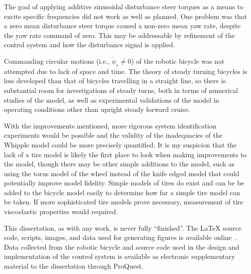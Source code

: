 The goal of applying additive sinusoidal disturbance steer torques as a means
to excite specific frequencies did not work as well as planned. One problem was
that a zero mean disturbance steer torque caused a non-zero mean yaw rate,
despite the yaw rate command of zero. This may be addressable by refinement of
the control system and how the disturbance signal is applied.

Commanding circular motions (i.e., $\dot{\psi}_c \ne 0$) of the robotic bicycle
was not attempted due to lack of space and time. The theory of steady turning
bicycles is less developed than that of bicycles travelling in a straight line,
so there is substantial room for investigations of steady turns, both in terms
of numerical studies of the model, as well as experimental validations of the
model in operating conditions other than upright steady forward cruise.

With the improvements mentioned, more rigorous system identification
experiments would be possible and the validity of the inadequacies of the
Whipple model could be more precisely quantified. It is my suspicion that the
lack of a tire model is likely the first place to look when making improvements
to the model, though there may be other simple additions to the model, such as
using the torus model of the wheel instead of the knife edged model that could
potentially improve model fidelity. Simple models of tires do exist and can be
be added to the bicycle model easily to determine how far a simple tire model
can be taken. If more sophisticated tire models prove necessary, measurement of
tire viscoelastic properties would required.

This dissertation, as with any work, is never fully ``finished''. The \LaTeX{}
source code, scripts, images, and data used for generating figures is available
online~\cite{Peterson2013}. Data collected from the robotic bicycle and source
code used in the design and implementation of the control system is available
as electronic supplementary material to the dissertation through ProQuest.

